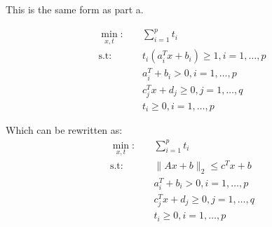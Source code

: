 \documentclass{report}
\begin{document}
This is the same form as part a. 

\begin{align*}
\min_{x, t}: \quad & \sum_{i=1}^{p} t_{i} \\
\text{s.t}: \quad & t_{i}(a_{i}^{T}x + b_{i}) \ge 1, i=1,\dots,p\\
		  &a_{i}^{T} + b_{i} > 0, i=1, \dots, p\\
		  &c_{j}^{T}x + d_{j} \ge 0, j=1,\dots, q\\
		  &t_{i} \ge 0, i=1, \dots,p
\end{align*}

Which can be rewritten as: 
\begin{align*}
\min_{x, t}: \quad & \sum_{i=1}^{p} t_{i} \\
\text{s.t}: &\lVert Ax + b \rVert_{2} \le c^{T}x + b \\
		  &a_{i}^{T} + b_{i} > 0, i=1, \dots, p\\
		  &c_{j}^{T}x + d_{j} \ge 0, j=1,\dots, q\\
		  &t_{i} \ge 0, i=1, \dots,p
\end{align*}
\end{document}
